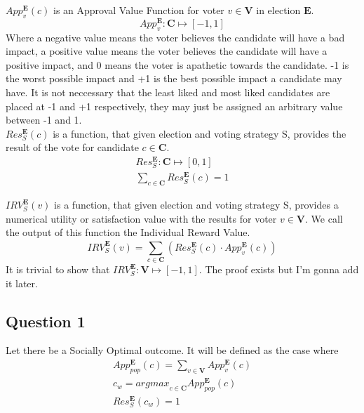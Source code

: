 \documentclass{article}
\begin{document}
$App^{\pmb{E}}_{v}(c)$ is an Approval Value Function for voter $v \in \pmb{V}$ in election $\pmb{E}$.
\begin{equation}
App^{\pmb{E}}_{v} : \pmb{C} \mapsto [-1,1]
\end{equation}
Where a negative value means the voter believes the candidate will have a bad impact, a positive value means the voter believes the candidate will have a positive impact, and 0 means the voter is apathetic towards the candidate. -1 is the worst possible impact and +1 is the best possible impact a candidate may have. It is not neccessary that the least liked and most liked candidates are placed at -1 and +1 respectively, they may just be assigned an arbitrary value between -1 and 1.\\

$Res^{\pmb{E}}_{S}(c)$ is a function, that given election  and voting strategy {S}, provides the result of the vote for candidate $c \in \pmb{C}$.
\begin{gather}
Res^{\pmb{E}}_{S} : \pmb{C} \mapsto [0,1]\\
\sum^{}_{c \in \pmb{C}}{Res^{\pmb{E}}_{S}(c)} = 1
\end{gather}

${IRV}^{\pmb{E}}_{S}(v)$ is a function, that given election  and voting strategy {S}, provides a numerical utility or satisfaction value with the results for voter $v \in \pmb{V}$. We call the output of this function the Individual Reward Value.
\begin{equation}
{IRV}^{\pmb{E}}_{S}(v) = \sum^{}_{c \in \pmb{C}}{(Res^{\pmb{E}}_{S}(c) \cdot App^{\pmb{E}}_{v}(c))}
\end{equation}
It is trivial to show that ${IRV}^{\pmb{E}}_{S} : \pmb{V} \mapsto [-1,1]$. The proof exists but I'm gonna add it later.


\subsection{Question 1}

Let there be a Socially Optimal outcome. It will be defined as the case where
\begin{gather}
App^{\pmb{E}}_{pop}(c) = \sum^{}_{v \in \pmb{V}}{App^{\pmb{E}}_{v}(c)}\\
c_{w} = {argmax}_{c \in \pmb{C}} App^{\pmb{E}}_{pop}(c)\\
Res^{\pmb{E}}_{S}(c_{w}) = 1
\end{gather}\\
\end{document}
